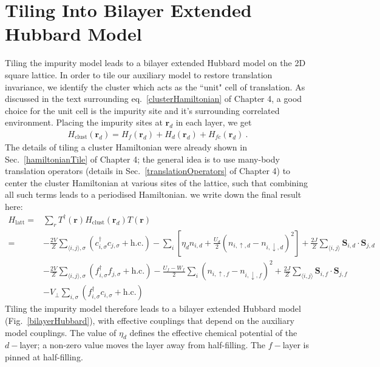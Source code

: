 \documentclass[%
reprint,
superscriptaddress,
groupedaddress,
superscriptaddress,
onecolumn,
10pt
]{revtex4-2}
\begin{document}
\section{Tiling Into Bilayer Extended Hubbard Model}
Tiling the impurity model leads to a bilayer extended Hubbard model on the 2D square lattice. In order to tile our auxiliary model to restore translation invariance, we identify the cluster which acts as the ``unit" cell of translation. As discussed in the text surrounding eq.~\ref{clusterHamiltonian} of Chapter 4, a good choice for the unit cell is the impurity site and it's surrounding correlated environment. Placing the impurity sites at \(\bm r_d\) in each layer, we get
\begin{equation}\begin{aligned}
	H_\text{clust}(\bm r_d) = H_f(\bm r_d) + H_d(\bm r_d) + H_{fc}(\bm r_d)~.
\end{aligned}\end{equation}
The details of tiling a cluster Hamiltonian were already shown in Sec.~\ref{hamiltonianTile} of Chapter 4; the general idea is to use many-body translation operators (details in Sec.~\ref{translationOperators} of Chapter 4) to center the cluster Hamiltonian at various sites of the lattice, such that combining all such terms leads to a periodised Hamiltonian. we write down the final result here:
\begin{equation}\begin{aligned}
	H_\text{latt} =& \sum_r T^\dagger(\bm r) H_\text{clust}(\bm r_d) T(\bm r)\\
	=& -\frac{2V}{Z}\sum_{\langle i,j \rangle ,\sigma}\left(c^\dagger_{i,\sigma}c_{j,\sigma} + \text{h.c.}\right) - \sum_i \left[\eta_d n_{i,d} + \frac{U_d}{2}(n_{i,\uparrow,d} - n_{i,\downarrow,d})^2\right] + \frac{2J}{Z}\sum_{\langle i,j \rangle}{\bm S}_{i,d}\cdot{\bm S}_{j,d}\\
				   & -\frac{2V}{Z}\sum_{\langle i,j \rangle ,\sigma}\left(f^\dagger_{i,\sigma}f_{j,\sigma} + \text{h.c.}\right) - \frac{U_f - W_f}{2}\sum_i \left(n_{i,\uparrow,f} - n_{i,\downarrow,f}\right)^2 + \frac{2J}{Z} \sum_{\langle i,j \rangle}{\bm S}_{i,f}\cdot{\bm S}_{j,f}\\
				   & - V_\perp \sum_{i,\sigma}(f^\dagger_{i,\sigma} c_{i,\sigma} + \text{h.c.})
\end{aligned}\end{equation}
Tiling the impurity model therefore leads to a bilayer extended Hubbard model (Fig.~\ref{bilayerHubbard}), with effective couplings that depend on the auxiliary model couplings. The value of \(\eta_d\) defines the effective chemical potential of the \(d-\)layer; a non-zero value moves the layer away from half-filling. The \(f-\)layer is pinned at half-filling.
\end{document}
